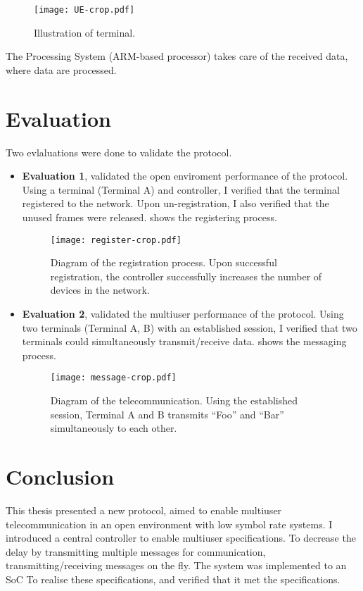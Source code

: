 ﻿\documentclass[twocolumn,9pt]{ltjsarticle}
\renewcommand{\ref}{\Cref}
\begin{document}
\begin{figure}[tb]
  \centering
  \texttt{[image: UE-crop.pdf]}
  \caption{\label{fig:terminal}
    Illustration of terminal.
  }
\end{figure}

The Processing System (ARM\textregistered -based processor) takes care of the received data, where data are processed.

\section{Evaluation}
Two evlaluations were done to validate the protocol.
\begin{itemize}
\item \textbf{Evaluation 1}, validated the open enviroment performance of the protocol.
  Using a terminal (Terminal A) and controller, I verified that the terminal registered to the network.
  Upon un-registration, I also verified that the unused frames were released.
  \ref{fig:register} shows the registering process.
  \begin{figure}[tb]
    \centering
    \texttt{[image: register-crop.pdf]}
    \caption{\label{fig:register}
      Diagram of the registration process.
      Upon successful registration, the controller successfully increases the number of devices in the network.
    }
  \end{figure}
\item \textbf{Evaluation 2}, validated the multiuser performance of the protocol.
  Using two terminals (Terminal A, B) with an established session, I verified that two terminals could simultaneously transmit/receive data.
  \ref{fig:message} shows the messaging process.
  
    \begin{figure}[tb]
    \centering
    \texttt{[image: message-crop.pdf]}
    \caption{\label{fig:message}
      Diagram of the telecommunication.
      Using the established session, Terminal A and B transmits ``Foo'' and ``Bar'' simultaneously to each other.
    }
  \end{figure}
\end{itemize}

\section{Conclusion}
This thesis presented a new protocol, aimed to enable multiuser telecommunication in an open environment with low symbol rate systems.
I introduced a central controller to enable multiuser specifications.
To decrease the delay by transmitting multiple messages for communication, transmitting/receiving messages on the fly.
 The system was implemented to an SoC To realise these specifications, and verified that it met the specifications.
\end{document}
